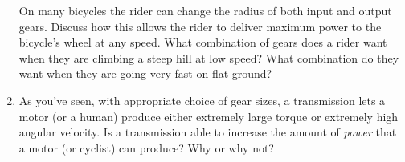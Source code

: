 \documentclass[12pt]{article}
\begin{document}
\begin{enumerate}
On many bicycles the rider can change the radius of both input and output gears. Discuss how this allows the rider to deliver maximum power to the bicycle's wheel at any speed. What combination of gears does a rider want when they are climbing a steep hill at low speed? What combination do they want when they are going very fast on flat ground?

\vspace{3in}


\item As you've seen, with appropriate choice of gear sizes, a transmission lets a motor (or a human) produce either extremely large torque or extremely high angular velocity. Is a transmission able to increase the amount of {\it power} that a motor (or cyclist) can produce? Why or why not?

\end{enumerate}

\newpage
\end{document}

